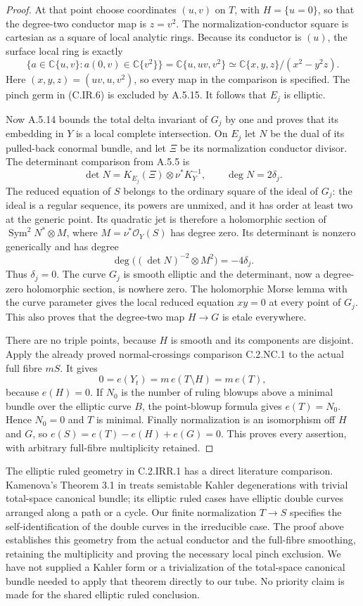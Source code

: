 \begin{proof}
At that point choose coordinates $(u,v)$ on $T$, with
$H=\{u=0\}$, so that the degree-two conductor map is
$z=v^2$. The normalization-conductor square is cartesian
as a square of local analytic rings. Because its conductor
is $(u)$, the surface local ring is exactly
\[
 \{a\in\mathbb C\{u,v\}:a(0,v)\in\mathbb C\{v^2\}\}
   =\mathbb C\{u,uv,v^2\}
   \simeq\mathbb C\{x,y,z\}/(x^2-y^2z).       \tag{C.IR.6}
\]
Here $(x,y,z)=(uv,u,v^2)$, so every map in the comparison
is specified. The pinch germ in (C.IR.6) is excluded by
A.5.15. It follows that $E_j$ is elliptic.

Now A.5.14 bounds the total delta invariant of $G_j$ by one
and proves that its embedding in $Y$ is a local complete
intersection. On $E_j$ let $N$ be the dual of its pulled-back
conormal bundle, and let $\Xi$ be its normalization conductor
divisor. The determinant comparison from A.5.5 is
\[
 \det N=K_{E_j}(\Xi)\otimes\nu^*K_Y^{-1},
 \qquad \deg N=2\delta_j.                       \tag{C.IR.7}
\]
The reduced equation of $S$ belongs to the ordinary square
of the ideal of $G_j$: the ideal is a regular sequence,
its powers are unmixed, and it has order at least two at
the generic point. Its quadratic jet is therefore a
holomorphic section of $\operatorname{Sym}^2N^*\otimes M$,
where $M=\nu^*\mathcal O_Y(S)$ has degree zero. Its determinant
is nonzero generically and has degree
\[
 \deg\bigl((\det N)^{-2}\otimes M^2\bigr)
                         =-4\delta_j.           \tag{C.IR.8}
\]
Thus $\delta_j=0$. The curve $G_j$ is smooth elliptic and
the determinant, now a degree-zero holomorphic section,
is nowhere zero. The holomorphic Morse lemma with the
curve parameter gives the local reduced equation $xy=0$
at every point of $G_j$. This also proves that the
degree-two map $H\to G$ is etale everywhere.

There are no triple points, because $H$ is smooth and its
components are disjoint. Apply the already proved
normal-crossings comparison C.2.NC.1 to the actual full
fibre $mS$. It gives
\[
 0=e(Y_t)=m\,e(T\setminus H)=m\,e(T),            \tag{C.IR.9}
\]
because $e(H)=0$. If $N_0$ is the number of ruling blowups
above a minimal bundle over the elliptic curve $B$, the
point-blowup formula gives $e(T)=N_0$. Hence $N_0=0$ and
$T$ is minimal. Finally normalization is an isomorphism
off $H$ and $G$, so
$e(S)=e(T)-e(H)+e(G)=0$. This proves every assertion,
with arbitrary full-fibre multiplicity retained.
\end{proof}

The elliptic ruled geometry in C.2.IRR.1 has a direct literature
comparison. Kamenova's Theorem 3.1 in \cite{KamenovaTori} treats
semistable Kahler degenerations with trivial total-space canonical
bundle; its elliptic ruled cases have elliptic double curves arranged
along a path or a cycle. Our finite normalization $T\to S$ specifies
the self-identification of the double curves in the irreducible case.
The proof above establishes this geometry from the actual conductor
and the full-fibre smoothing, retaining the multiplicity and proving
the necessary local pinch exclusion. We have not supplied a Kahler
form or a trivialization of the total-space canonical bundle needed
to apply that theorem directly to our tube. No priority claim is
made for the shared elliptic ruled conclusion.
